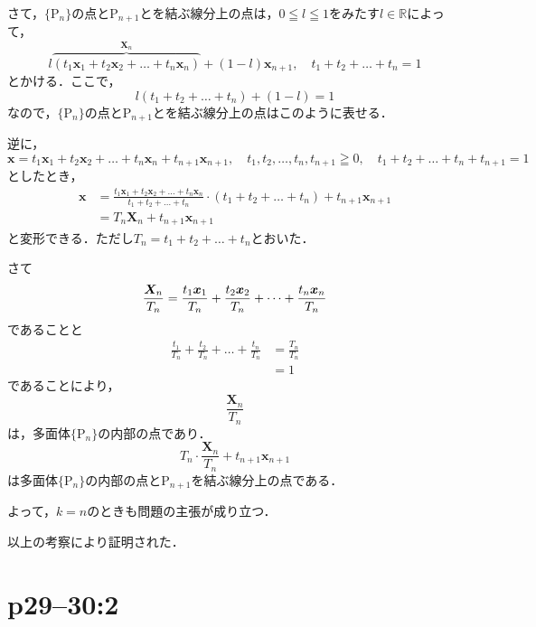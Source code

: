 \begin{tproof}
  さて，$\{ \mathrm{P}_n \}$の点と$\mathrm{P}_{n+1}$とを結ぶ線分上の点は，$ 0 \leqq l \leqq 1$をみたす$l \in \mathbb{R}$によって，
  \[
    l \overbrace{(  t_1 \bm{x}_1 + t_2 \bm{x}_2+\dots+ t_n \bm{x}_n)}^{\bm{X}_n}+(1-l) \bm{x}_{n+1} , \quad t_1+t_2+\dots + t_n =1
  \]
  とかける．ここで，
  \[
    l(t_1+t_2+\dots+t_n)+(1-l)=1
  \]
  なので，$\{ \mathrm{P}_n \}$の点と$\mathrm{P}_{n+1}$とを結ぶ線分上の点はこのように表せる．

  逆に，
  \[
    \bm{x} = t_1 \bm{x}_1 + t_2 \bm{x}_2 + \dots + t_n \bm{x}_n + t_{n+1} \bm{x}_{n+1} , \quad t_1, t_2 ,\dots , t_n,t_{n+1} \geqq 0 ,\quad  t_1 +t_2 + \dots+t_n + t_{n+1} =1
  \]
  としたとき，
  \begin{align*}
    \bm{x} & =\frac{t_1 \bm{x}_1 + t_2 \bm{x}_2+\dots+ t_n \bm{x}_n}{t_1+t_2+\dots+t_n} \cdot (t_1+t_2+\dots+t_n) +t_{n+1} \bm{x}_{n+1} \\
           & = T_n \bm{X}_n + t_{n+1} \bm{x}_{n+1}
  \end{align*}
  と変形できる．ただし$T_n = t_1 + t_2 +\dots+t_n$とおいた．

  さて
  \[
    \frac{\bm{X}_n }{T_n} = \frac{t_1 \bm{x}_1 }{T_n}+ \frac{t_2 \bm{x}_2 }{T_n}+\dots +  \frac{t_n \bm{x}_n }{T_n}  \\
  \]
  であることと
  \begin{align*}
    \frac{t_1}{T_n}+\frac{t_2 }{T_n} +\dots +\frac{t_n }{T_n} & = \frac{T_n}{T_n} \\
                                                              & = 1
  \end{align*}
  であることにより，
  \[
    \frac{\bm{X}_n}{T_n}
  \]
  は，多面体$\{ \mathrm{P}_n \}$の内部の点であり．
  \[
    T_n \cdot \frac{\bm{X}_n}{T_n} + t_{n+1} \bm{x}_{n+1}
  \]
  は多面体$\{ \mathrm{P}_n \}$の内部の点と$\mathrm{P}_{n+1}$を結ぶ線分上の点である．

  よって，$k=n$のときも問題の主張が成り立つ．

  以上の考察により証明された．
\end{tproof}

\section*{p29--30:2}

